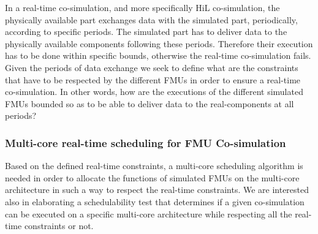 In a real-time co-simulation, and more specifically HiL co-simulation, the physically available part exchanges data with the simulated part, periodically, according to specific periods. The simulated part has to deliver data to the physically available components following these periods. Therefore their execution has to be done within specific bounds, otherwise the real-time co-simulation fails. Given the periods of data exchange we seek to define what are the constraints that have to be respected by the different FMUs in order to ensure a real-time co-simulation. In other words, how are the executions of the different simulated FMUs bounded so as to be able to deliver data to the real-components at all periods?

\subsubsection{Multi-core real-time scheduling for FMU Co-simulation}

Based on the defined real-time constraints, a multi-core scheduling algorithm is needed in order to allocate the functions of simulated FMUs on the multi-core architecture in such a way to respect the real-time constraints. We are interested also in elaborating a schedulability test that determines if a given co-simulation can be executed on a specific multi-core architecture while respecting all the real-time constraints or not.  